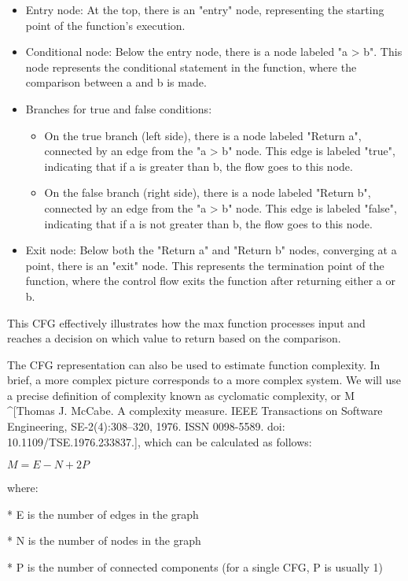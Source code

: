 \begin{markdown}

\begin{itemize}
\item
Entry node: At the top, there is an "entry" node, representing the starting point of the function's execution.

\item
Conditional node: Below the entry node, there is a node labeled "a > b". This node represents the conditional statement in the function, where the comparison between a and b is made.

\item
Branches for true and false conditions:
\begin{itemize}
\item
On the true branch (left side), there is a node labeled "Return a", connected by an edge from the "a > b" node. This edge is labeled "true", indicating that if a is greater than b, the flow goes to this node.

\item
On the false branch (right side), there is a node labeled "Return b", connected by an edge from the "a > b" node. This edge is labeled "false", indicating that if a is not greater than b, the flow goes to this node.
\end{itemize}

\item
Exit node: Below both the "Return a" and "Return b" nodes, converging at a point, there is an "exit" node. This represents the termination point of the function, where the control flow exits the function after returning either a or b.
\end{itemize}

This CFG effectively illustrates how the max function processes input and reaches a decision on which value to return based on the comparison.

The CFG representation can also be used to estimate function complexity. In brief, a more complex picture corresponds to a more complex system. We will use a precise definition of complexity known as cyclomatic complexity, or M ^[Thomas J. McCabe. A complexity measure. IEEE Transactions on Software Engineering, SE-2(4):308–320, 1976. ISSN 0098-5589. doi: 10.1109/TSE.1976.233837.], which can be calculated as follows:
\end{markdown}

$M = E - N + 2P$

where:

\begin{markdown}
* E is the number of edges in the graph

* N is the number of nodes in the graph

* P is the number of connected components (for a single CFG, P is usually 1)
\end{markdown}

